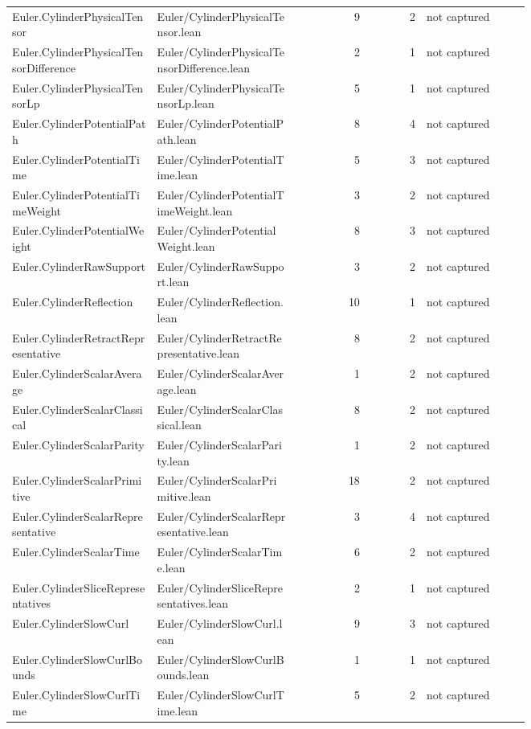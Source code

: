 \documentclass[10pt]{article}
\begin{document}
\begin{longtable}{p{0.28\linewidth}p{0.27\linewidth}r r p{0.20\linewidth}}
Euler.CylinderPhysicalTensor & Euler/CylinderPhysicalTensor.lean & 9 & 2 & not captured\\
Euler.CylinderPhysicalTensorDifference & Euler/CylinderPhysicalTensorDifference.lean & 2 & 1 & not captured\\
Euler.CylinderPhysicalTensorLp & Euler/CylinderPhysicalTensorLp.lean & 5 & 1 & not captured\\
Euler.CylinderPotentialPath & Euler/CylinderPotentialPath.lean & 8 & 4 & not captured\\
Euler.CylinderPotentialTime & Euler/CylinderPotentialTime.lean & 5 & 3 & not captured\\
Euler.CylinderPotentialTimeWeight & Euler/CylinderPotentialTimeWeight.lean & 3 & 2 & not captured\\
Euler.CylinderPotentialWeight & Euler/CylinderPotentialWeight.lean & 8 & 3 & not captured\\
Euler.CylinderRawSupport & Euler/CylinderRawSupport.lean & 3 & 2 & not captured\\
Euler.CylinderReflection & Euler/CylinderReflection.lean & 10 & 1 & not captured\\
Euler.CylinderRetractRepresentative & Euler/CylinderRetractRepresentative.lean & 8 & 2 & not captured\\
Euler.CylinderScalarAverage & Euler/CylinderScalarAverage.lean & 1 & 2 & not captured\\
Euler.CylinderScalarClassical & Euler/CylinderScalarClassical.lean & 8 & 2 & not captured\\
Euler.CylinderScalarParity & Euler/CylinderScalarParity.lean & 1 & 2 & not captured\\
Euler.CylinderScalarPrimitive & Euler/CylinderScalarPrimitive.lean & 18 & 2 & not captured\\
Euler.CylinderScalarRepresentative & Euler/CylinderScalarRepresentative.lean & 3 & 4 & not captured\\
Euler.CylinderScalarTime & Euler/CylinderScalarTime.lean & 6 & 2 & not captured\\
Euler.CylinderSliceRepresentatives & Euler/CylinderSliceRepresentatives.lean & 2 & 1 & not captured\\
Euler.CylinderSlowCurl & Euler/CylinderSlowCurl.lean & 9 & 3 & not captured\\
Euler.CylinderSlowCurlBounds & Euler/CylinderSlowCurlBounds.lean & 1 & 1 & not captured\\
Euler.CylinderSlowCurlTime & Euler/CylinderSlowCurlTime.lean & 5 & 2 & not captured\\

\end{longtable}
\end{document}
